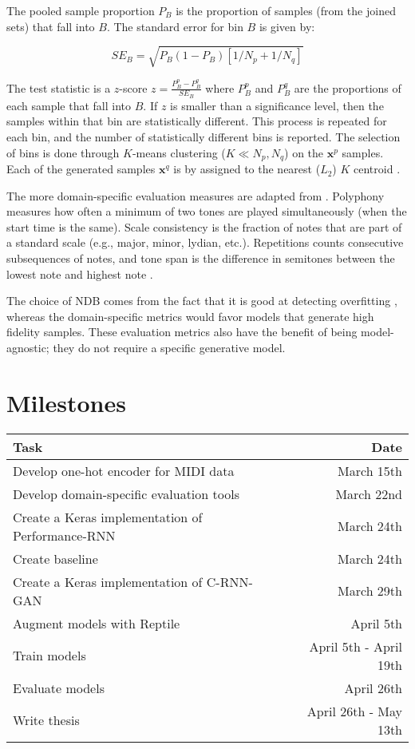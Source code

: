 \documentclass[11pt, a4paper, man, floatsintext]{apa6}
\begin{document}
The pooled sample proportion $P_B$ is the proportion of samples (from the joined sets) that fall into $B$. The standard error for bin $B$ is given by:

\begin{equation}
    SE_B = \sqrt{P_B (1 - P_B)[1 / N_p + 1 / N_q]}
\end{equation}

The test statistic is a $z$-score $z = \frac{P_B^p - P_B^q}{SE_B}$ where $P_B^p$ and $P_B^q$ are the proportions of each sample that fall into $B$. If $z$ is smaller than a significance level, then the samples within that bin are statistically different. This process is repeated for each bin, and the number of statistically different bins is reported. The selection of bins is done through $K$-means clustering ($K \ll N_p, N_q$) on the $\mathbf{x}^p$ samples. Each of the generated samples $\mathbf{x}^q$ is by assigned to the nearest ($L_2$) $K$ centroid \parencite{richardson_gans_2018}.

The more domain-specific evaluation measures are adapted from \textcite{mogren_c-rnn-gan_2016}. Polyphony measures how often a minimum of two tones are played simultaneously (when the start time is the same). Scale consistency is the fraction of notes that are part of a standard scale (e.g., major, minor, lydian, etc.). Repetitions counts consecutive subsequences of notes, and tone span is the difference in semitones between the lowest note and highest note \parencite{mogren_c-rnn-gan_2016}.

The choice of NDB comes from the fact that it is good at detecting overfitting \parencite{borji_pros_2018}, whereas the domain-specific metrics would favor models that generate high fidelity samples. These evaluation metrics also have the benefit of being model-agnostic; they do not require a specific generative model.

\section{Milestones}

\begin{table}
    \centering
    \begin{tabular}{l|r}
        Task    & Date \\ \hline
        Develop one-hot encoder for MIDI data & March 15th \\
        Develop domain-specific evaluation tools & March 22nd \\
        Create a Keras implementation of Performance-RNN & March 24th \\
        Create baseline & March 24th \\
        Create a Keras implementation of C-RNN-GAN & March 29th \\
        Augment models with Reptile & April 5th \\
        Train models & April 5th - April 19th \\
        Evaluate models & April 26th \\
        Write thesis & April 26th - May 13th \\
    \end{tabular}
\end{table}


\printbibliography
\end{document}
